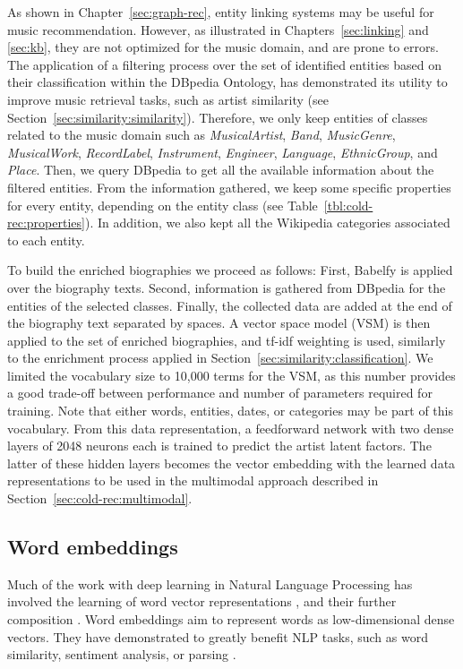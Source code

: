As shown in Chapter~\ref{sec:graph-rec}, entity linking systems may be useful for music recommendation. However, as illustrated in Chapters~\ref{sec:linking} and \ref{sec:kb}, they are not optimized for the music domain, and are prone to errors. The application of a filtering process over the set of identified entities based on their classification within the DBpedia Ontology, has demonstrated its utility to improve music retrieval tasks, such as artist similarity (see Section~\ref{sec:similarity:similarity}). Therefore, we only keep entities of classes related to the music domain such as \textit{MusicalArtist}, \textit{Band}, \textit{MusicGenre}, \textit{MusicalWork}, \textit{RecordLabel}, \textit{Instrument}, \textit{Engineer}, \textit{Language}, \textit{EthnicGroup}, and \textit{Place}. Then, we query DBpedia to get all the available information about the filtered entities. From the information gathered, we keep some specific properties for every entity, depending on the entity class (see Table~\ref{tbl:cold-rec:properties}). In addition, we also kept all the Wikipedia categories associated to each entity.


To build the enriched biographies we proceed as follows: First, Babelfy is applied over the biography texts. Second, information is gathered from DBpedia for the entities of the selected classes. Finally, the collected data are added at the end of the biography text separated by spaces. A vector space model (VSM) is then applied to the set of enriched biographies, and tf-idf weighting \citep{Zobel1998} is used, similarly to the enrichment process applied in Section~\ref{sec:similarity:classification}. We limited the vocabulary size to 10,000 terms for the VSM, as this number provides a good trade-off between performance and number of parameters required for training. Note that either words, entities, dates, or categories may be part of this vocabulary. From this data representation, a feedforward network with two dense layers of 2048 neurons each is trained to predict the artist latent factors. The latter of these hidden layers becomes the vector embedding with the learned data representations to be used in the multimodal approach described in Section~\ref{sec:cold-rec:multimodal}.

\subsection{Word embeddings}\label{sec:cold-rec:w2v}

Much of the work with deep learning in Natural Language Processing has involved the learning of word vector representations \citep{Bengio2003,Mikolov2013}, and their further composition \citep{Collobert2011}. Word embeddings aim to represent words as low-dimensional dense vectors. They have demonstrated to greatly benefit NLP tasks, such as word similarity, sentiment analysis, or parsing \citep{Nguyen2016}. 

